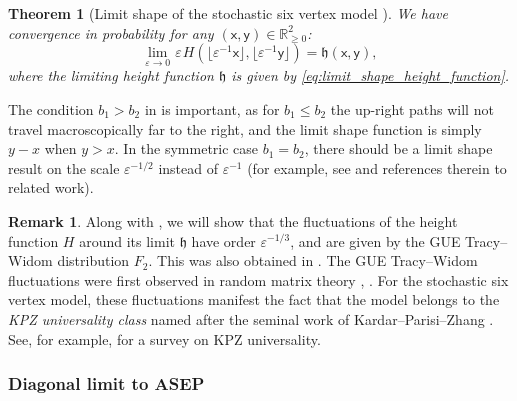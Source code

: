 \documentclass[letterpaper,11pt,oneside,reqno]{article}
\numberwithin{equation}{section}
\newcommand{\ssp}{\hspace{1pt}}
\newtheorem{theorem}[proposition]{Theorem}
\theoremstyle{definition}
\newtheorem{remark}[proposition]{Remark}
\theoremstyle{remark}
\begin{document}
\begin{theorem}[Limit shape of the stochastic six vertex model \cite{BCG6V}]
	\label{thm:BCG6V_limit_shape}
	We have convergence in probability for any $(\mathsf{x},\mathsf{y})\in \mathbb{R}_{\ge0}^2$:
	\begin{equation*}
		\lim_{\varepsilon\to 0}
		\ssp \varepsilon\ssp
		H\left( 
		\lfloor \varepsilon^{-1}\mathsf{x} \rfloor ,
		\lfloor \varepsilon^{-1}\mathsf{y} \rfloor \right)
		=\mathfrak{h}(\mathsf{x},\mathsf{y}),
	\end{equation*}
	where the limiting height function $\mathfrak{h}$ is given by \eqref{eq:limit_shape_height_function}.
\end{theorem}

The condition $b_1>b_2$ in  is important, as for $b_1\le b_2$
the up-right paths will not travel macroscopically far to the right, and the limit shape 
function is simply $y-x$ when $y>x$. 
In the symmetric case $b_1=b_2$, there should be a limit shape result on the scale $\varepsilon^{-1/2}$ instead of
$\varepsilon^{-1}$ (for example, see \cite{ImamuraMallickSasamoto2021} and references therein to related work).

\begin{remark}
	\label{rmk:fluctuations}
	Along with , we will
	show that the fluctuations of the height function
	$H$ around its limit 
	$\mathfrak{h}$ have order $\varepsilon^{-1/3}$,
	and are given by the GUE Tracy--Widom distribution $F_2$.
	This was also obtained in \cite{BCG6V}.
	The GUE Tracy--Widom fluctuations were first observed 
	in random matrix theory
	\cite{Forrester1993},
	\cite{tracy_widom1994level_airy}.
	For the stochastic six vertex model, 
	these fluctuations manifest the fact that the
	model belongs to the \emph{KPZ universality class}
	named after the seminal work of 
	Kardar--Parisi--Zhang \cite{KPZ1986}.
	See, for example, \cite{CorwinKPZ}
	for a survey on KPZ universality.
\end{remark}

\subsubsection{Diagonal limit to ASEP}
\label{subsub:diagonal_limit_ASEP}
\end{document}
